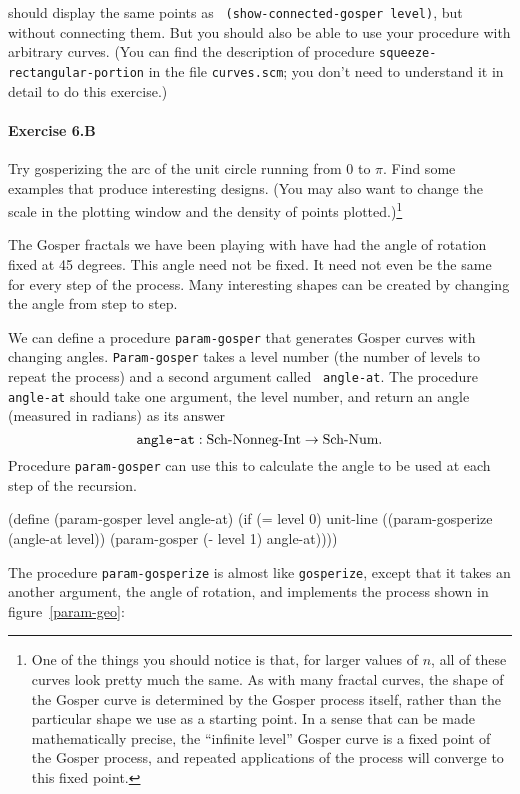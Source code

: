 \noindent should display the same points as {\tt
(show-connected-gosper level)}, but without connecting them.  But you
should also be able to use your procedure with arbitrary curves.  (You can
find the description of procedure {\tt squeeze-rectangular-portion} in the
file {\tt curves.scm}; you don't need to understand it in detail to do
this exercise.)

\paragraph{Exercise 6.B}
Try gosperizing the arc of the unit circle running from 0 to $\pi$.  Find
some examples that produce interesting designs.  (You may also want to
change the scale in the plotting window and the density of points
plotted.)\footnote{One of the things you should notice is that, for larger
values of $n$, all of these curves look pretty much the same.  As with
many fractal curves, the shape of the Gosper curve is determined by the
Gosper process itself, rather than the particular shape we use as a
starting point.  In a sense that can be made mathematically precise, the
``infinite level'' Gosper curve is a fixed point of the Gosper process,
and repeated applications of the process will converge to this fixed
point.}

\medskip

The Gosper fractals we have been playing with have had the angle of
rotation fixed at 45 degrees. This angle need not be fixed.  It need not
even be the same for every step of the process.  Many interesting shapes
can be created by changing the angle from step to step.

We can define a procedure {\tt param-gosper} that generates Gosper curves
with changing angles.  {\tt Param-gosper} takes a level number (the number
of levels to repeat the process) and a second argument called {\tt
angle-at}. The procedure {\tt angle-at} should take one argument, the level
number, and return an angle (measured in radians) as its answer
\[\hbox{\tt angle-at} : \mbox{Sch-Nonneg-Int} \rightarrow \mbox{Sch-\-Num}.\]
Procedure {\tt param-gosper} can use this to calculate the angle to be
used at each step of the recursion.

\beginlisp
(define (param-gosper level angle-at)
  (if (= level 0)
      unit-line
      ((param-gosperize (angle-at level))
       (param-gosper (- level 1) angle-at))))
\endlisp


The procedure {\tt param-gosperize} is almost like {\tt gosperize}, except
that it takes an another argument, the angle of rotation, and implements
the process shown in figure~\ref{param-geo}:

